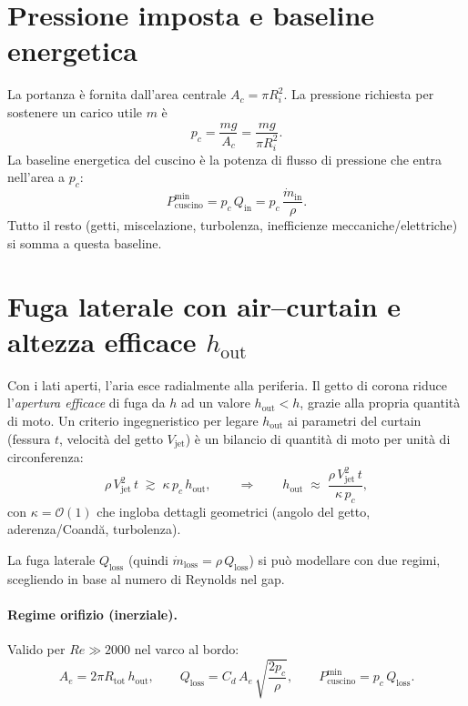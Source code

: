 \documentclass[11pt,a4paper]{article}
\begin{document}
\section{Pressione imposta e baseline energetica}
La portanza è fornita dall'area centrale \(A_c=\pi R_i^2\). La pressione richiesta per sostenere un carico utile \(m\) è
\begin{equation}
  p_c=\frac{m g}{A_c}=\frac{m g}{\pi R_i^2}.
\end{equation}
La baseline energetica del cuscino è la potenza di flusso di pressione che entra nell'area a \(p_c\):
\begin{equation}
  P_{\mathrm{cuscino}}^{\min}=p_c\,Q_{\mathrm{in}}=p_c\,\frac{\dot{m}_{\mathrm{in}}}{\rho}.
\end{equation}
Tutto il resto (getti, miscelazione, turbolenza, inefficienze meccaniche/elettriche) si somma a questa baseline.

\section{Fuga laterale con air--curtain e altezza efficace \texorpdfstring{$h_{\mathrm{out}}$}{h\_out}}

Con i lati aperti, l'aria esce radialmente alla periferia. Il getto di corona riduce l'\emph{apertura efficace} di fuga da \(h\) ad un valore \(h_{\mathrm{out}}<h\), grazie alla propria quantità di moto. Un criterio ingegneristico per legare \(h_{\mathrm{out}}\) ai parametri del curtain (fessura \(t\), velocità del getto \(V_{\mathrm{jet}}\)) è un bilancio di quantità di moto per unità di circonferenza:
\begin{equation}
  \rho\,V_{\mathrm{jet}}^2\,t \;\gtrsim\; \kappa\,p_c\,h_{\mathrm{out}},
  \qquad \Rightarrow \qquad
  h_{\mathrm{out}}\;\approx\;\frac{\rho\,V_{\mathrm{jet}}^2\,t}{\kappa\,p_c},
  \label{eq:hout}
\end{equation}
con \(\kappa=\mathcal{O}(1)\) che ingloba dettagli geometrici (angolo del getto, aderenza/Coandă, turbolenza).

La fuga laterale \(Q_{\mathrm{loss}}\) (quindi \(\dot{m}_{\mathrm{loss}}=\rho\,Q_{\mathrm{loss}}\)) si può modellare con due regimi, scegliendo in base al numero di Reynolds nel gap.

\paragraph{Regime orifizio (inerziale).}
Valido per \(Re\gg 2000\) nel varco al bordo:
\begin{equation}
  A_e=2\pi R_{\mathrm{tot}}\,h_{\mathrm{out}},\qquad
  Q_{\mathrm{loss}}=C_d\,A_e\,\sqrt{\frac{2p_c}{\rho}},
  \qquad
  P_{\mathrm{cuscino}}^{\min}=p_c\,Q_{\mathrm{loss}}.
\end{equation}
\end{document}
